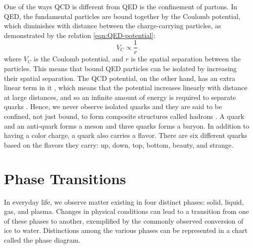 One of the ways QCD is different from QED is the confinement of partons. In QED, the fundamental particles are bound together by the Coulomb potential, which diminishes with distance between the charge-carrying particles, as demonstrated by the relation \ref{eqn:QED-potential}:
\begin{equation}\label{eqn:QED-potential}
V_{C}\propto\frac{1}{r} 
\end{equation}
where $V_{C}$ is the Coulomb potential, and $r$ is the spatial separation between the particles. This means that bound QED particles can be isolated by increasing their spatial separation. The QCD potential, on the other hand, has an extra linear term in it%
, which means that the potential increases linearly with distance at large distances, and so an infinite amount of energy is required to separate quarks \cite{Bali:2000gf}. Hence, we never observe isolated quarks and they are said to be confined, not just bound, to form composite structures called hadrons \cite{0954-3899-32-3-R01}. A quark and an anti-quark forms a meson and three quarks forms a baryon. In addition to having a color charge, a quark also carries a flavor. There are six different quarks based on the flavors they carry: up, down, top, bottom, beauty, and strange.


\section{Phase Transitions}
In everyday life, we observe matter existing in four distinct phases: solid, liquid, gas, and plasma. Changes in physical conditions can lead to a transition from one of these phases to another, exemplified by the commonly observed conversion of ice to water. Distinctions among the various phases can be represented in a chart called the phase diagram.

